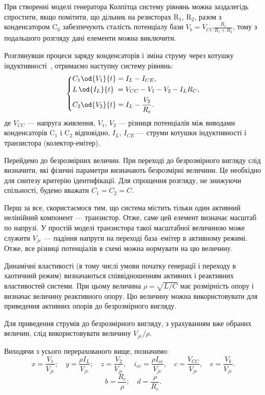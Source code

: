При створенні моделі генератора Колпітца систему рівнянь можна
заздалегідь спростити, якщо помітити, що дільник на резисторах
$\mathrm{R}_1 $,
$\mathrm{R}_2 $, разом з конденсатором
$\mathrm{C}_0 $ забезпечують сталість потенціалу бази
$V_b = V_{CC} \frac{R_1}{R_1 + R_2} $, тому з подальшого розгляду дані елементи
можна виключити.

Розглянувши процеси заряду конденсаторів і зміна струму через
котушку індуктивності~\cite{zaeplnii_radio_calc}, отримаємо наступну
систему рівнянь:
%
\begin{equation}
\label{atu:eq:colp_phys}
\begin{dcases}
  C_1 \od{V_{1}}{t}  = I_L - I_{CE} , \\
  L\, \od{I_L}{t} \; = V_{CC} - V_{1} - V_{2} - I_L R_C , \\
  C_2 \od{V_{2}}{t}  = I_L - \frac{V_{2}}{R_e}.
\end{dcases}
\end{equation}
%
%
де
$ V_{CC} $ --- напруга живлення,
$ V_1 $, $ V_2 $ --- різниця потенціалів між виводами конденсаторів
$ \mathrm{C}_1 $ і
$ \mathrm{C}_2 $ відповідно,
$ I_L $,
$ I_{CE} $ --- струми котушки індуктивності і транзистора (колектор-емітер).


Перейдемо до безрозмірних величин. При переході до
безрозмірного вигляду слід визначити, які фізичні параметри
визначають безрозмірні величини. Це необхідно для синтезу
критерію ідентифікації. Для спрощення розгляду, не знижуючи
спільності, будемо вважати
$ C_1 = C_2 = C $.

Перш за все, скористаємося тим, що система містить тільки
один активний нелінійний компонент --- транзистор. Отже, саме
цей елемент визначає масштаб по напрузі. У простій моделі
транзистора такої масштабної величиною може служити
$ V_{je} $ --- падіння напруги на переході база--емітер в активному
режимі. Отже, все різниці потенціалів в схемі можна нормувати
на цю величину.

Динамічні властивості (в тому числі умови початку генерації
і переходу в хаотичний режим) визначаються співвідношенням
активних і реактивних властивостей системи. При цьому величина
$ \rho = \sqrt{L/C} $ має розмірність опору і визначає величину
реактивного опору. Цю величину можна використовувати для
приведення активних опорів до безрозмірного вигляду.

Для приведення струмів до безрозмірного вигляду, з урахуванням
вже обраних величин, слід використовувати величину
$ V_{je} / \rho $.


Виходячи з усього перерахованого вище, позначимо:
%
\[
  x = \frac{V_{1}}{V_{je}} ; \quad
  y = \frac{\rho I_L}{V_{je}} ; \quad
  z = \frac{V_{2}}{V_{je}}, \quad
  i_{ce} = \frac{\rho I_{ce}}{V_{je}}, \quad
  c = \frac{V_{CC}}{V_{je}}, \quad
  e = \frac{V_{b}}{V_{je}}.
\]
%
\[
  b = \frac{R_c}{\rho}; \quad
  d = \frac{\rho}{R_e}. %
\]

